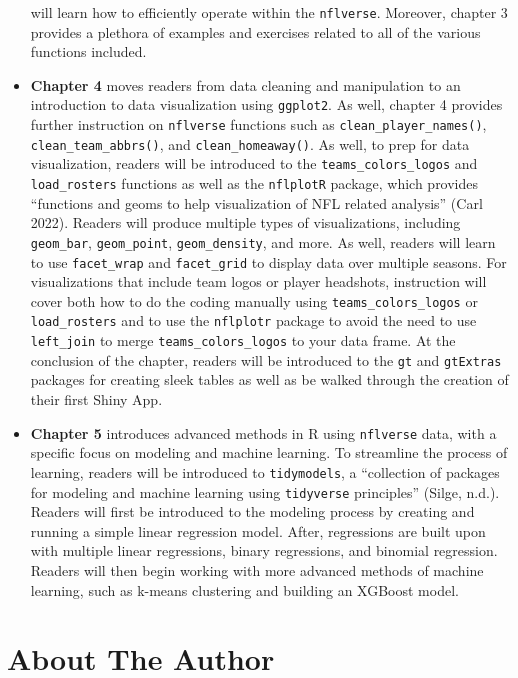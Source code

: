 \documentclass[
  letterpaper,
]{krantz}
\begin{document}
\begin{itemize}
  will learn how to efficiently operate within the \texttt{nflverse}.
  Moreover, chapter 3 provides a plethora of examples and exercises
  related to all of the various functions included.
\item
  \textbf{Chapter 4} moves readers from data cleaning and manipulation
  to an introduction to data visualization using \texttt{ggplot2}. As
  well, chapter 4 provides further instruction on \texttt{nflverse}
  functions such as \texttt{clean\_player\_names()},
  \texttt{clean\_team\_abbrs()}, and \texttt{clean\_homeaway()}. As
  well, to prep for data visualization, readers will be introduced to
  the \texttt{teams\_colors\_logos} and \texttt{load\_rosters} functions
  as well as the \texttt{nflplotR} package, which provides ``functions
  and geoms to help visualization of NFL related analysis'' (Carl 2022).
  Readers will produce multiple types of visualizations, including
  \texttt{geom\_bar}, \texttt{geom\_point}, \texttt{geom\_density}, and
  more. As well, readers will learn to use \texttt{facet\_wrap} and
  \texttt{facet\_grid} to display data over multiple seasons. For
  visualizations that include team logos or player headshots,
  instruction will cover both how to do the coding manually using
  \texttt{teams\_colors\_logos} or \texttt{load\_rosters} and to use the
  \texttt{nflplotr} package to avoid the need to use \texttt{left\_join}
  to merge \texttt{teams\_colors\_logos} to your data frame. At the
  conclusion of the chapter, readers will be introduced to the
  \texttt{gt} and \texttt{gtExtras} packages for creating sleek tables
  as well as be walked through the creation of their first Shiny App.
\item
  \textbf{Chapter 5} introduces advanced methods in R using
  \texttt{nflverse} data, with a specific focus on modeling and machine
  learning. To streamline the process of learning, readers will be
  introduced to \texttt{tidymodels}, a ``collection of packages for
  modeling and machine learning using \texttt{tidyverse} principles''
  (Silge, n.d.). Readers will first be introduced to the modeling
  process by creating and running a simple linear regression model.
  After, regressions are built upon with multiple linear regressions,
  binary regressions, and binomial regression. Readers will then begin
  working with more advanced methods of machine learning, such as
  k-means clustering and building an XGBoost model.
\end{itemize}

\hypertarget{about-the-author}{%
\section*{About The Author}\label{about-the-author}}
\end{document}
